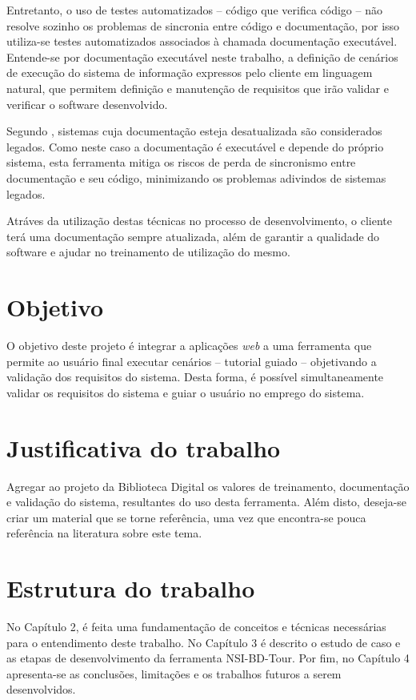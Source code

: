 Entretanto, o uso de testes automatizados – código que verifica código – não resolve sozinho os problemas de sincronia entre código e documentação, por isso utiliza-se testes automatizados associados à chamada documentação executável. Entende-se por documentação executável neste trabalho, a definição de cenários de execução do sistema de informação expressos pelo cliente em linguagem natural, que permitem definição e manutenção de requisitos que irão validar e verificar o software desenvolvido.

Segundo , sistemas cuja documentação esteja desatualizada são considerados legados. Como neste caso a documentação é executável e depende do próprio sistema, esta ferramenta mitiga os riscos de perda de sincronismo entre documentação e seu código, minimizando os problemas adivindos de sistemas legados.

Atráves da utilização destas técnicas no processo de desenvolvimento, o cliente terá uma documentação sempre atualizada, além de garantir a qualidade do software e ajudar no treinamento de utilização do mesmo.

\section{Objetivo}

O objetivo deste projeto é integrar a aplicações \textit{web} a uma ferramenta que permite ao usuário final executar cenários – tutorial guiado – objetivando a validação dos requisitos do sistema. Desta forma, é possível simultaneamente validar os requisitos do sistema e guiar o usuário no emprego do sistema.

\section{Justificativa do trabalho}

Agregar ao projeto da Biblioteca Digital os valores de treinamento, documentação e validação do sistema, resultantes do uso desta ferramenta. Além disto, deseja-se criar um material que se torne referência, uma vez que encontra-se pouca referência na literatura sobre este tema.

\section{Estrutura do trabalho}

No Capítulo 2, é feita uma fundamentação de conceitos e técnicas necessárias para o entendimento deste trabalho. No Capítulo 3 é descrito o estudo de caso e as etapas de desenvolvimento da ferramenta NSI-BD-Tour. Por fim, no Capítulo 4 apresenta-se as conclusões, limitações e os trabalhos futuros a serem desenvolvidos.